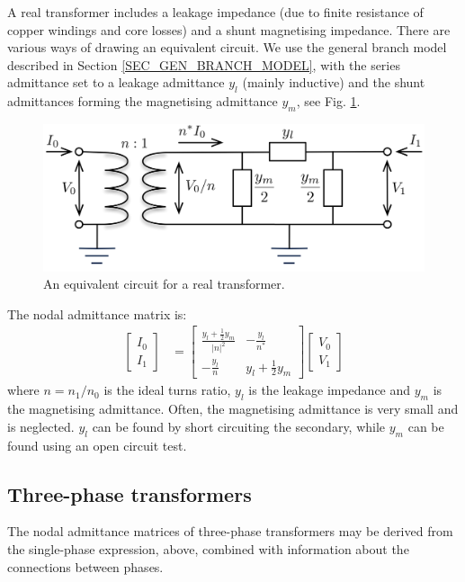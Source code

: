 \documentclass[10pt]{article}
\begin{document}
A real transformer includes a leakage impedance (due to finite resistance of copper windings and core losses) and a shunt magnetising impedance. There are various ways of drawing an equivalent circuit. We use the general branch model described in Section \ref{SEC_GEN_BRANCH_MODEL}, with the series admittance set to a leakage admittance $y_l$ (mainly inductive) and the shunt admittances forming the magnetising admittance $y_m$, see Fig. \ref{FIG_REAL_TRANS}.
\begin{figure}[!h]
	\begin{center}
		\includegraphics[width=(\textwidth-2cm)]{transformer.png}
	\end{center}
	\caption{
		An equivalent circuit for a real transformer.
	}
	\label{FIG_REAL_TRANS}
\end{figure}

The nodal admittance matrix is:
\begin{align}
\begin{bmatrix}I_0 \\ I_1 \end{bmatrix} &= 
\begin{bmatrix}\frac{y_l + \frac{1}{2}y_m}{|n|^2} & -\frac{y_l}{n^*} \\ -\frac{y_l}{n} & y_l + \frac{1}{2}y_m\end{bmatrix}
\begin{bmatrix}V_0 \\ V_1 \end{bmatrix}
\label{EQ_REAL_TRANS}
\end{align}
where $n = n_1/n_0$ is the ideal turns ratio, $y_l$ is the leakage impedance and $y_m$ is the magnetising admittance. Often, the magnetising admittance is very small and is neglected. $y_l$ can be found by short circuiting the secondary, while $y_m$ can be found using an open circuit test.

\subsection{Three-phase transformers}
The nodal admittance matrices of three-phase transformers may be derived from the single-phase expression, above, combined with information about the connections between phases.
\end{document}

